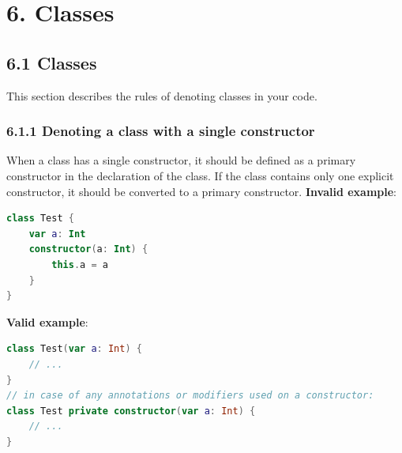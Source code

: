 \section*{\textbf{6. Classes}}
\label{sec:6.}
\subsection*{\textbf{6.1 Classes}}
\label{sec:6.1}
This section describes the rules of denoting classes in your code.
\subsubsection*{\textbf{6.1.1  Denoting a class with a single constructor}}
\leavevmode\newline
\label{sec:6.1.1}
When a class has a single constructor, it should be defined as a primary constructor in the declaration of the class. If the class contains only one explicit constructor, it should be converted to a primary constructor.
\textbf{Invalid example}:
\begin{lstlisting}[language=Kotlin]
class Test {
    var a: Int
    constructor(a: Int) {
        this.a = a
    }
}
\end{lstlisting}
\textbf{Valid example}:
\begin{lstlisting}[language=Kotlin]
class Test(var a: Int) { 
    // ...
}
// in case of any annotations or modifiers used on a constructor:
class Test private constructor(var a: Int) { 
    // ...
}
\end{lstlisting}
